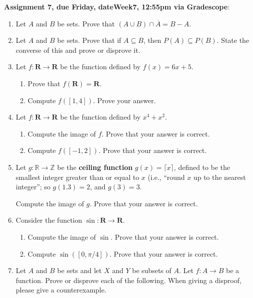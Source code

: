 \documentclass[12pt]{article}
\newcommand{\HWdueTime}{12:55pm }
\begin{document}
\noindent \textbf{Assignment 7, due Friday, \csname dateWeek7\endcsname, \HWdueTime via Gradescope}:
\begin{enumerate}

\item Let $A$ and $B$ be sets. Prove that $(A \cup B) \cap \overline{A} = B - A$.

\item Let $A$ and $B$ be sets. Prove that if $A \subseteq B$, then $P(A) \subseteq P(B)$. State the converse of this and prove or disprove it.  
  
\item Let $f \colon \mathbf{R} \to \mathbf{R}$ be the function defined by $f(x) = 6x+5$.
 \begin{enumerate}
 \item Prove that $f(\mathbf{R}) = \mathbf{R}$.
 \item Compute $f([1,4])$. Prove your answer.
 \end{enumerate}
\item Let $f \colon \mathbf{R} \to \mathbf{R}$ be the function defined by $x^4 + x^2$. 
 \begin{enumerate}
 \item Compute the image of $f$. Prove that your answer is correct.
 \item Compute $f([-1,2])$. Prove that your answer is correct.
\end{enumerate}

\item Let $g \colon \mathbb{R} \to \mathbb{Z}$ be the \textbf{ceiling function} $g(x) = \lceil x \rceil$, defined to be the smallest integer greater than or equal to $x$ (i.e., ``round $x$ up to the nearest integer''; so $g(1.3)  = 2$, and $g(3) = 3$.

  Compute the image of $g$. Prove that your answer is correct.


  
\item Consider the function $\sin \colon \mathbf{R} \to \mathbf{R}$.
  \begin{enumerate}
  \item Compute the image of $\sin$. Prove that your answer is correct.
  \item Compute $\sin([0,\pi/4])$. Prove that your answer is correct.
  \end{enumerate}

\item Let $A$ and $B$ be sets and let $X$ and $Y$ be subsets of $A$. Let $f\colon A \to B$ be a function. Prove or disprove each of the following. When giving a disproof, please give a counterexample.
 \begin{enumerate}


\end{enumerate}
\end{enumerate}
\end{document}
